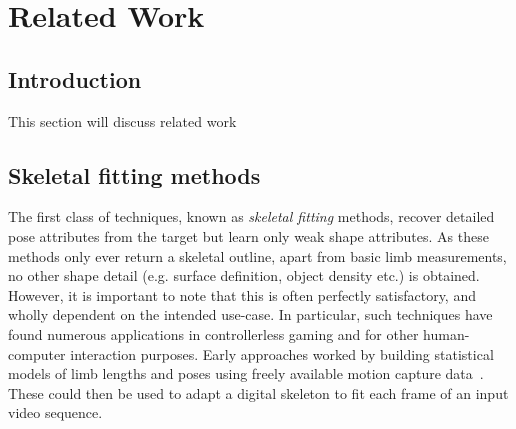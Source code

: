 
\chapter{Related Work}

\ifpdf
    \graphicspath{{Chapter3/Figs/Raster/}{Chapter3/Figs/PDF/}{Chapter3/Figs/}}
\else
    \graphicspath{{Chapter3/Figs/Vector/}{Chapter3/Figs/}}
\fi

\section{Introduction}

This section will discuss related work

\section{Skeletal fitting methods}

The first class of techniques, known as \textit{skeletal fitting} methods, recover detailed pose attributes from the target but learn only weak shape attributes. As these methods only ever return a skeletal outline, apart from basic limb measurements, no other shape detail (e.g. surface definition, object density etc.) is obtained. However, it is important to note that this is often perfectly satisfactory, and wholly dependent on the intended use-case. In particular, such techniques have found numerous applications in controllerless gaming and for other human-computer interaction purposes. Early approaches worked by building statistical models of limb lengths and poses using freely available motion capture data~\cite{barron2001estimating}. These could then be used to adapt a digital skeleton to fit each frame of an input video sequence. 

